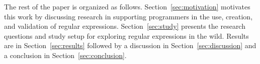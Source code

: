 The rest of the paper is organized as follows. Section~\ref{sec:motivation} motivates this work by discussing research in supporting programmers in the use, creation, and validation of regular expressions. Section~\ref{sec:study} presents the research questions and study setup for exploring regular expressions in the wild. Results are in Section~\ref{sec:results} followed by a discussion in Section~\ref{sec:discussion} and a conclusion in Section~\ref{sec:conclusion}.
